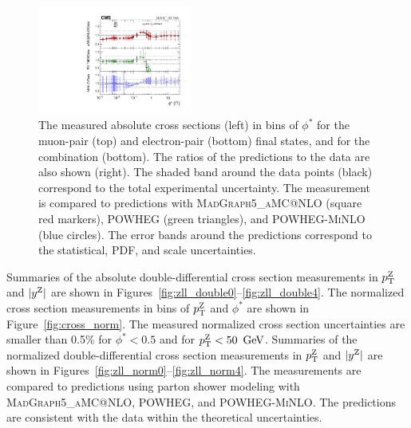 \begin{figure}
	\includegraphics[width=0.45\textwidth]{figures/zpt/zll_phi_ratio.pdf}
	\caption{The measured absolute cross sections (left) in bins of $\phi^*$ for the muon-pair (top) and electron-pair (bottom) final states, and for the combination (bottom). The ratios of the predictions to the data are also shown (right). The shaded band around the data points (black) correspond to the total experimental uncertainty. The measurement is compared to predictions with \textsc{MadGraph5\_aMC@NLO} (square red markers), \textsc{POWHEG} (green triangles), and \textsc{POWHEG-MiNLO} (blue circles). The error bands around the predictions correspond to the statistical, PDF, and scale uncertainties.}
	\label{fig:unf_phi}
\end{figure}

Summaries of the absolute double-differential cross section measurements in 
$p_{\mathrm{T}}^{\mathrm{Z}}$ and $|y^{\mathrm{Z}}|$ are shown in Figures~\ref{fig:zll_double0}--\ref{fig:zll_double4}. 
The normalized cross section measurements in bins of  $p_{\mathrm{T}}^{\mathrm{Z}}$ and  $\phi^*$ are shown in Figure~\ref{fig:cross_norm}. 
The measured normalized cross section  uncertainties are smaller than 0.5\% for $\phi^*<0.5$ and for $p_{\mathrm{T}}^{\mathrm{Z}}<50~\,\text{Ge\hspace{-.08em}V}$. 
Summaries of the normalized double-differential cross section measurements in $p_{\mathrm{T}}^{\mathrm{Z}}$ and $|y^{\mathrm{Z}}|$ are shown in Figures~\ref{fig:zll_norm0}--\ref{fig:zll_norm4}.
The measurements are compared to predictions using parton shower modeling with \textsc{MadGraph5\_aMC@NLO}, \textsc{POWHEG}, and \textsc{POWHEG-MiNLO}. The predictions are consistent with the data within the theoretical uncertainties.     


